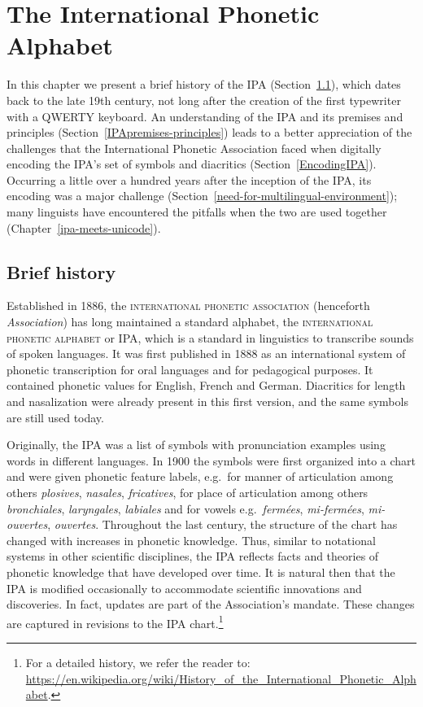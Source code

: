 \chapter{The International Phonetic Alphabet}
\label{the-international-phonetic-alphabet}

In this chapter we present a brief history of the IPA 
(Section~\ref{IPAhistory}), which dates 
back to the late 19th century, not long after the creation of the first 
typewriter with a QWERTY 
keyboard. An understanding of the IPA and its premises and principles 
(Section~\ref{IPApremises-principles}) leads to a better 
appreciation of the challenges that the International Phonetic Association 
faced when digitally encoding the IPA's set of symbols and 
diacritics (Section~\ref{EncodingIPA}). Occurring a little over a hundred years after 
the inception of the IPA, its encoding was a major challenge 
(Section~\ref{need-for-multilingual-environment}); many 
linguists have encountered the pitfalls when the two are used together 
(Chapter~\ref{ipa-meets-unicode}).

\section{Brief history}
\label{IPAhistory}

Established in 1886, the \textsc{international phonetic association} (henceforth
\textit{Association}) has long maintained a standard alphabet, the
\textsc{international phonetic alphabet} or IPA, which is a
standard in linguistics to transcribe sounds of spoken languages. It was
first published in 1888 as an international system of phonetic transcription for
oral languages and for pedagogical purposes. It contained phonetic values for
English, French and German. Diacritics for length and nasalization were already
present in this first version, and the same symbols are still used today. 

Originally, the IPA was a list of symbols with pronunciation examples
using words in different languages. In 1900 the symbols were first organized into
a chart and were given phonetic feature labels, e.g.\ for manner of
articulation among others \textit{plosives}, \textit{nasales}, \textit{fricatives}, for place of
articulation among others \textit{bronchiales}, \textit{laryngales}, \textit{labiales} and for vowels
e.g.\ \textit{fermées}, \textit{mi-fermées}, \textit{mi-ouvertes}, \textit{ouvertes}. Throughout the last
century, the structure of the chart has changed with increases in phonetic
knowledge. Thus, similar to notational systems in other scientific disciplines,
the IPA reflects facts and theories of phonetic knowledge that have developed
over time. It is natural then that the IPA is modified occasionally to
accommodate scientific innovations and discoveries. In fact, updates are part of the
Association's mandate. These changes are captured in revisions to the IPA chart.\footnote{For a detailed history, 
we refer the reader to:
\url{https://en.wikipedia.org/wiki/History\_of\_the\_International\_Phonetic_Alphabet}.}

